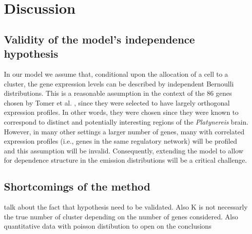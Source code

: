 	\section{Discussion}
		\subsection{Validity of the model's independence hypothesis}
		In our model we assume that, conditional upon the allocation of a cell to a cluster, the gene expression levels can be described by independent Bernoulli distributions. This is a reasonable assumption in the context of the 86 genes chosen by Tomer et al. \cite{Tomer10}, since they were selected to have largely orthogonal expression profiles. In other words, they were chosen since they were known to correspond to distinct and potentially interesting regions of the {\it{Platynereis}} brain. However, in many other settings a larger number of genes, many with correlated expression profiles (i.e., genes in the same regulatory network) will be profiled and this assumption will be invalid. Consequently, extending the model to allow for dependence structure in the emission distributions will be a critical challenge.
		\subsection{Shortcomings of the method}
		talk about the fact that hypothesis need to be validated. Also K is not necessarly the true number of cluster depending on the number of genes considered. Also quantitative data with poisson distibution to open on the conclusions
	



